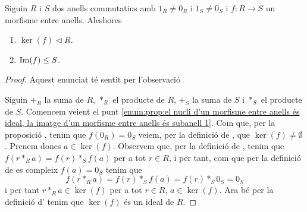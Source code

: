\documentclass[../Apunts.tex]{subfiles}
\begin{document}
	\begin{proposition}
		\label{prop:el nucli d'un morfisme entre anells és ideal, la imatge d'un morfisme entre anells és subanell}
			Siguin \(R\) i \(S\) dos anells commutatius amb \(1_{R}\neq0_{R}\) i \(1_{S}\neq0_{S}\) i \(f\colon R\longrightarrow S\) un morfisme entre anells. Aleshores
		\begin{enumerate}
			\item\label{enum:prop:el nucli d'un morfisme entre anells és ideal, la imatge d'un morfisme entre anells és subanell 1} \(\ker(f)\triangleleft R\).
			\item\label{enum:prop:el nucli d'un morfisme entre anells és ideal, la imatge d'un morfisme entre anells és subanell 2} \(\operatorname{Im}(f)\leq S\).
		\end{enumerate}
		\begin{proof}
			Aquest enunciat té sentit per l'observació 
			
			Siguin \(+_{R}\) la suma de \(R\), \(\ast_{R}\) el producte de \(R\), \(+_{S}\) la suma de \(S\) i \(\ast_{S}\) el producte de \(S\). Comencem veient el punt \eqref{enum:prop:el nucli d'un morfisme entre anells és ideal, la imatge d'un morfisme entre anells és subanell 1}. Com que, per la proposició , tenim que \(f(0_{R})=0_{S}\) veiem, per la definició de , que \(\ker(f)\neq\emptyset\). Prenem doncs \(a\in\ker(f)\). Observem que, per la definició de , tenim que \(f(r\ast_{R}a)=f(r)\ast_{S}f(a)\) per a tot \(r\in R\), i per tant, com que per la definició de  es compleix \(f(a)=0_{S}\) tenim que \[f(r\ast_{R}a)=f(r)\ast_{S}f(a)=f(r)\ast_{S}0_{S}=0_{S}\]
			i per tant \(r\ast_{R}a\in\ker(f)\) per a tot \(r\in R\), \(a\in\ker(f)\). Ara bé per la definició d' tenim que \(\ker(f)\) és un ideal de \(R\).
			

\end{proof}
\end{proposition}
\end{document}
